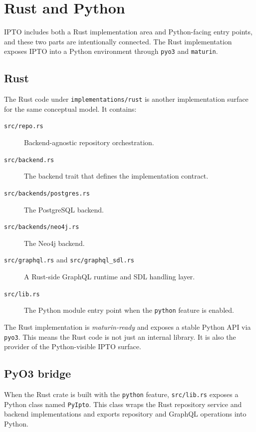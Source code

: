 \section{Rust and Python}
\label{sec:RustPythonImplementation}

IPTO includes both a Rust implementation area and Python-facing entry points, and these two parts are intentionally connected. The Rust implementation exposes IPTO into a Python environment through \texttt{pyo3} and \texttt{maturin}. 

\subsection{Rust}

The Rust code under \texttt{implementations/rust} is another implementation surface for the same conceptual model. It contains:
\begin{description}
\item[\texttt{src/repo.rs}] Backend-agnostic repository orchestration.
\vspace{.2cm}
\item[\texttt{src/backend.rs}] The backend trait that defines the implementation contract.
\vspace{.2cm}
\item[\texttt{src/backends/postgres.rs}] The PostgreSQL backend.
\vspace{.2cm}
\item[\texttt{src/backends/neo4j.rs}] The Neo4j backend.
\vspace{.2cm}
\item[\texttt{src/graphql.rs} and \texttt{src/graphql\_sdl.rs}] A Rust-side GraphQL runtime and SDL handling layer.
\vspace{.2cm}
\item[\texttt{src/lib.rs}] The Python module entry point when the \texttt{python} feature is enabled.
\end{description}

The Rust implementation is \emph{maturin-ready} and exposes a stable Python API via \texttt{pyo3}. This means the Rust code is not just an internal library. It is also the provider of the Python-visible IPTO surface.

\subsection{PyO3 bridge}

When the Rust crate is built with the \texttt{python} feature, \texttt{src/lib.rs} exposes a Python class named \texttt{PyIpto}. This class wraps the Rust repository service and backend implementations and exports repository and GraphQL operations into Python.


